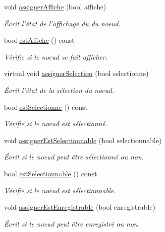 \begin{DoxyCompactItemize}
void \hyperlink{group__inf2990_gad5205d1e1b63fb66175a8580261d5eea}{assigner\-Affiche} (bool affiche)
\begin{DoxyCompactList}\small\item\em Écrit l'état de l'affichage du du noeud. \end{DoxyCompactList}\item 
bool \hyperlink{group__inf2990_ga07fc02e86d59ccd2680f9e5f5b8e373d}{est\-Affiche} () const 
\begin{DoxyCompactList}\small\item\em Vérifie si le noeud se fait afficher. \end{DoxyCompactList}\item 
virtual void \hyperlink{group__inf2990_ga0f39647390d357d8662a870f0c76242c}{assigner\-Selection} (bool selectionne)
\begin{DoxyCompactList}\small\item\em Écrit l'état de la sélection du noeud. \end{DoxyCompactList}\item 
bool \hyperlink{group__inf2990_ga8fb7a3313ce4d361ef7ec8e45ba8add5}{est\-Selectionne} () const 
\begin{DoxyCompactList}\small\item\em Vérifie si le noeud est sélectionné. \end{DoxyCompactList}\item 
void \hyperlink{group__inf2990_ga397add0bac7ec3b842598a2085990b7d}{assigner\-Est\-Selectionnable} (bool selectionnable)
\begin{DoxyCompactList}\small\item\em Écrit si le noeud peut être sélectionné ou non. \end{DoxyCompactList}\item 
bool \hyperlink{group__inf2990_gaa3f3a34571af62de0da5db2d8f54f690}{est\-Selectionnable} () const 
\begin{DoxyCompactList}\small\item\em Vérifie si le noeud est sélectionnable. \end{DoxyCompactList}\item 
void \hyperlink{group__inf2990_gabb7f3756a4094dc588690126ec0703d3}{assigner\-Est\-Enregistrable} (bool enregistrable)
\begin{DoxyCompactList}\small\item\em Écrit si le noeud peut être enregistré ou non. \end{DoxyCompactList}\item 

\end{DoxyCompactItemize}
